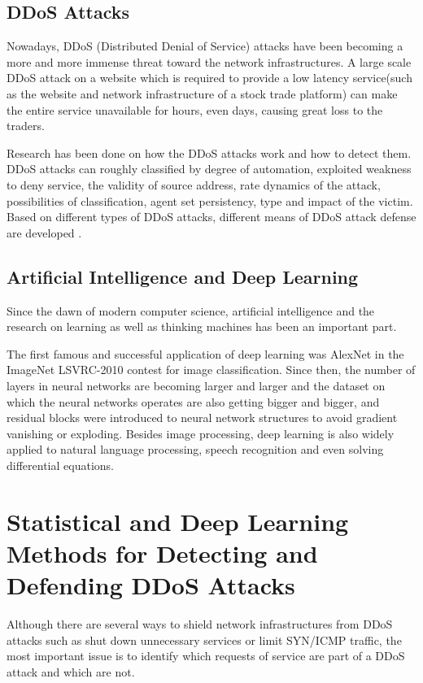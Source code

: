 \documentclass[paper=a4, fontsize=12pt]{scrartcl} %
\numberwithin{equation}{section} %
\numberwithin{figure}{section} %
\numberwithin{table}{section} %
\begin{document}
        \subsection{DDoS Attacks}
                
 Nowadays, DDoS (Distributed Denial of Service) attacks have been becoming a more and more immense threat toward the network infrastructures. A large scale DDoS attack on a website which is required to provide a low latency service(such as the website and network infrastructure of a stock trade platform) can make the entire service unavailable for hours, even days, causing great loss to the traders. 
 
Research has been done on how the DDoS attacks work and how to detect them. DDoS attacks can roughly classified by degree of automation,  exploited weakness to deny service, the validity of source address, rate dynamics of the attack, possibilities of classification, 
     agent set persistency, type and impact of the victim. Based on different types of DDoS attacks, different means of DDoS attack defense are developed \cite{mirkovic_taxonomy_2004}.


\subsection{Artificial Intelligence and Deep Learning}

Since the dawn of modern computer science, artificial intelligence and the research on learning as well as thinking machines  has been an important part. 

The first famous and successful application of deep learning was AlexNet in the ImageNet LSVRC-2010 contest \cite{NIPS2012_4824} for image classification. Since then, the number of layers in neural networks are becoming larger and larger and the dataset on which the neural networks operates are also getting bigger and bigger\cite{DBLP:journals/corr/SimonyanZ14a}, and residual blocks were introduced to neural network structures to avoid gradient vanishing or exploding\cite{DBLP:conf/cvpr/HeZRS16}. Besides image processing, deep learning is also widely applied to natural language processing, speech recognition and even solving differential equations.


\section{Statistical and Deep Learning Methods for Detecting and Defending DDoS Attacks}
Although there are several ways to shield network infrastructures from DDoS attacks such as shut down unnecessary services or limit SYN/ICMP traffic\cite{malik_review:_2015}, the most important issue is to identify which requests of service are part of a DDoS attack and which are not\cite{Yu:2013:DDS:2556385}.
\end{document}
